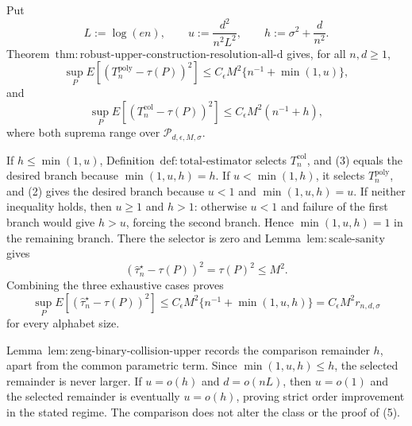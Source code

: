 Put
\[
 L:=\log(en),\qquad u:=\frac{d^2}{n^2L^2},
 \qquad h:=\sigma^2+\frac d{n^2}.
\tag{1}
\]
Theorem~\(\mathrm{thm:robust\text{-}upper\text{-}construction\text{-}resolution\text{-}all\text{-}d}\) gives, for all \(n,d\ge1\),
\[
 \sup_P E[(T_n^{\mathrm{poly}}-\tau(P))^2]
 \le C_{\epsilon}M^2\{n^{-1}+\min(1,u)\},
\tag{2}
\]
and
\[
 \sup_P E[(T_n^{\mathrm{col}}-\tau(P))^2]
 \le C_{\epsilon}M^2(n^{-1}+h),
\tag{3}
\]
where both suprema range over \(\mathcal P_{d,\epsilon,M,\sigma}\).

If \(h\le\min(1,u)\), Definition~\(\mathrm{def:total\text{-}estimator}\) selects \(T_n^{\mathrm{col}}\), and (3) equals the desired branch because \(\min(1,u,h)=h\).  If \(u<\min(1,h)\), it selects \(T_n^{\mathrm{poly}}\), and (2) gives the desired branch because \(u<1\) and \(\min(1,u,h)=u\).  If neither inequality holds, then \(u\ge1\) and \(h>1\): otherwise \(u<1\) and failure of the first branch would give \(h>u\), forcing the second branch.  Hence \(\min(1,u,h)=1\) in the remaining branch.  There the selector is zero and Lemma~\(\mathrm{lem:scale\text{-}sanity}\) gives
\[
 (\widehat\tau_n^{\star}-\tau(P))^2=\tau(P)^2\le M^2.
\tag{4}
\]
Combining the three exhaustive cases proves
\[
 \sup_P E[(\widehat\tau_n^{\star}-\tau(P))^2]
 \le C_{\epsilon}M^2\{n^{-1}+\min(1,u,h)\}
 =C_{\epsilon}M^2r_{n,d,\sigma}
\tag{5}
\]
for every alphabet size.

Lemma~\(\mathrm{lem:zeng\text{-}binary\text{-}collision\text{-}upper}\) records the comparison remainder \(h\), apart from the common parametric term.  Since \(\min(1,u,h)\le h\), the selected remainder is never larger.  If \(u=o(h)\) and \(d=o(nL)\), then \(u=o(1)\) and the selected remainder is eventually \(u=o(h)\), proving strict order improvement in the stated regime.  The comparison does not alter the class or the proof of (5).